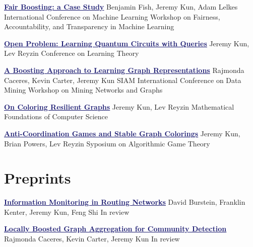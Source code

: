 \documentclass[11pt]{moderncv}
\begin{document}
         {\href{http://www.fatml.org/papers/Fish_Kun_Lelkes.pdf}{\textcolor{MidnightBlue}{\underline{\textbf{Fair Boosting: a Case Study}}}}}
      {Benjamin Fish, Jeremy Kun, Adam Lelkes}
      {International Conference on Machine Learning Workshop on Fairness, Accountability, and Transparency in Machine Learning}
      {}
      {}

         {\href{http://jmlr.org/proceedings/papers/v40/Kun15.html}{\textcolor{MidnightBlue}{\underline{\textbf{Open Problem: Learning Quantum Circuits with Queries}}}}}
      {Jeremy Kun, Lev Reyzin}
      {Conference on Learning Theory}
      {}
      {}

         {\href{http://arxiv.org/abs/1401.3258}{\textcolor{MidnightBlue}{\underline{\textbf{A Boosting Approach to Learning Graph Representations}}}}}
      {Rajmonda Caceres, Kevin Carter, Jeremy Kun}
      {SIAM International Conference on Data Mining Workshop on Mining Networks and Graphs}
      {}
      {}

         {\href{http://arxiv.org/abs/1402.4376}{\textcolor{MidnightBlue}{\underline{\textbf{On Coloring Resilient Graphs}}}}}
      {Jeremy Kun, Lev Reyzin}
      {Mathematical Foundations of Computer Science}
      {}
      {}

         {\href{http://arxiv.org/abs/1308.3258}{\textcolor{MidnightBlue}{\underline{\textbf{Anti-Coordination Games and Stable Graph Colorings}}}}}
      {Jeremy Kun, Brian Powers, Lev Reyzin}
      {Syposium on Algorithmic Game Theory}
      {}
      {}


   \section{Preprints}
         \cventry{}
         {\href{http://arxiv.org/abs/1507.05206}{\textcolor{MidnightBlue}{\underline{\textbf{Information Monitoring in Routing Networks}}}}}
      {}
      {David Burstein, Franklin Kenter, Jeremy Kun, Feng Shi}
      {}
      {In review}

      \cventry{}
         {\href{http://arxiv.org/abs/1405.3210}{\textcolor{MidnightBlue}{\underline{\textbf{Locally Boosted Graph Aggregation for Community Detection}}}}}
      {}
      {Rajmonda Caceres, Kevin Carter, Jeremy Kun}
      {}
      {In review}
\end{document}
